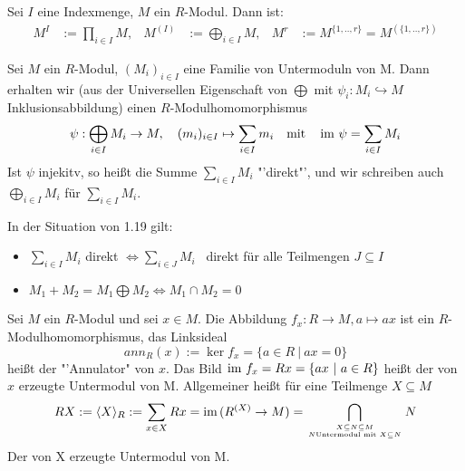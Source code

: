\begin{anm}
	Sei $I$ eine Indexmenge, $M$ ein $R$-Modul. Dann ist:\\
	 \begin{align*}
	 M^I &:= \prod_{i \in I}M, & M^{(I)} &:= \bigoplus_{i \in I}M, & M^{r} &:= M^{\{1,..,r\}}=M^{(\{1,..,r\})}
	 \end{align*}
\end{anm}
\begin{bem}
	Sei $M$ ein $R$-Modul, $(M_i)_{i \in I}$ eine Familie von Untermoduln von M. Dann erhalten wir (aus der Universellen Eigenschaft von $\bigoplus$ mit $\psi_i:M_i\hookrightarrow M$ Inklusionsabbildung) einen $R$-Modulhomomorphismus $$ \psi:\bigoplus_{i \in I} M_i \to M, \quad (m_i)_{i \in I} \mapsto \sum_{i\in I}m_i \quad \text{mit} \quad\operatorname{\text{im}\,}\psi = \sum_{i\in I}M_i $$
	Ist $\psi$ injekitv, so heißt die Summe $\sum_{i\in I}M_i $ "'direkt"', und wir schreiben auch $\bigoplus_{i \in I}M_i $ für $ \sum_{i\in I}M_i$.
\end{bem}
\begin{anm} In der Situation von 1.19 gilt:
	\begin{itemize}
		\item $\sum_{i\in I}M_i $ direkt $\Longleftrightarrow \sum_{i\in J}M_i $ \ direkt für alle Teilmengen $J \subseteq I$ 
		\item $M_1+M_2 = M_1 \bigoplus M_2 \Longleftrightarrow M_1 \cap M_2 =0$
	\end{itemize}
\end{anm}
\begin{df}
	Sei $M$ ein $R$-Modul und sei $x \in M$. Die Abbildung $f_{x}:R \to M, a \mapsto ax$ ist ein $R$-Modulhomomorphismus, das Linksideal $$ ann_{R}(x) := \ker f_x = \{a \in R \ | \  ax=0\}$$ heißt der "'Annulator" von $x$. Das Bild $\operatorname{\text{im}\,} f_x = Rx=\{ax \ | \ a \in R\} $ heißt der von $x$ erzeugte Untermodul von M. Allgemeiner heißt für eine Teilmenge $X \subseteq M$ $$ RX := \langle X\rangle_{R} := \sum_{x\in X} Rx = \operatorname{\text{im}\,}(R^{(X)} \to M) = \bigcap_{X \subseteq N \subseteq M \atop N \text{Untermodul} \text{ mit } X \subseteq N}N $$
	Der von X erzeugte Untermodul von M.
\end{df}
